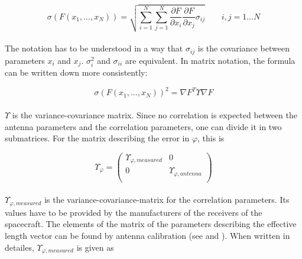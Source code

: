 \documentclass[a4paper,10pt]{thesis}
\begin{document}
\begin{equation}\label{error_prop_multi_variant}
\sigma (F(x_1,...,x_N))= \sqrt{\sum_{i=1}^N \sum_{j=1}^N \frac{\partial F}{\partial x_i} \frac{\partial F}{\partial x_j} \sigma_{ij} } \qquad i,j=1...N
\end{equation}

\paragraph*{}
The notation has to be understood in a way that $\sigma_{ij}$ is the covariance between parameters $x_i$ and $x_j$. $\sigma_i^2$ and $\sigma_{ii}$ are equivalent. In matrix notation, the formula can be written down more consistently:

\begin{equation}\label{error_prop_multi_variant_matrix}
\sigma (F(x_1,...,x_N))^2= \nabla F^T \Upsilon \nabla F
\end{equation}

\paragraph*{}
$\Upsilon$ is the variance-covariance matrix. Since no correlation is expected between the antenna parameters and the correlation parameters, one can divide it in two submatrices. For the matrix describing the error in $\varphi$, this is

\begin{equation}\label{var-covar-matr_phi_simpli2}
\Upsilon_\varphi=\left(%
\begin{array}{cc}
 \Upsilon_{\varphi,measured} & 0 \\
0 & \Upsilon_{\varphi,antenna} \\
\end{array}%
\right)
\end{equation}

\paragraph*{}
$\Upsilon_{\varphi,measured}$ is the variance-covariance-matrix for the correlation parameters. Its values have to be provided by the manufacturers of the receivers of the spacecraft. The elements of the matrix of the parameters describing the effective length vector can be found by antenna calibration (see \cite{antenna_report_1} and \cite{antenna_report_2}). When written in detailes, $\Upsilon_{\varphi,measured}$ is given as
\end{document}
